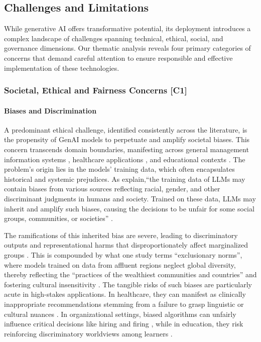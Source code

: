 \subsection{Challenges and Limitations}
While generative AI offers transformative potential, its deployment introduces a complex landscape of challenges spanning technical, ethical, social, and governance dimensions. Our thematic analysis reveals four primary categories of concerns that demand careful attention to ensure responsible and effective implementation of these technologies.

\subsubsection{Societal, Ethical and Fairness Concerns [C1]}
\paragraph{Biases and Discrimination}
A predominant ethical challenge, identified consistently across the literature, is the propensity of GenAI models to perpetuate and amplify societal biases. This concern transcends domain boundaries, manifesting across general management information systems \parencite{R01, R02, R04, R07, R08, R10, S09}, healthcare applications \parencite{R09, S01, S11, S16}, and educational contexts \parencite{S14}. The problem's origin lies in the models' training data, which often encapsulates historical and systemic prejudices. As \citeauthor{R02} explain,\enquote{the training data of LLMs may contain biases from various sources reflecting racial, gender, and other discriminant judgments in humans and society. Trained on these data, LLMs may inherit and amplify such biases, causing the decisions to be unfair for some social groups, communities, or societies} \parencite{R02}. 

The ramifications of this inherited bias are severe, leading to discriminatory outputs and representational harms that disproportionately affect marginalized groups \parencite{R02, S09, S11}. This is compounded by what one study terms ``exclusionary norms'', where models trained on data from affluent regions neglect global diversity, thereby reflecting the \enquote{practices of the wealthiest communities and countries} and fostering cultural insensitivity \parencite{S09}. The tangible risks of such biases are particularly acute in high-stakes applications. In healthcare, they can manifest as clinically inappropriate recommendations stemming from a failure to grasp linguistic or cultural nuances \parencite{S01}. In organizational settings, biased algorithms can unfairly influence critical decisions like hiring and firing \parencite{R09}, while in education, they risk reinforcing discriminatory worldviews among learners \parencite{S14}.

